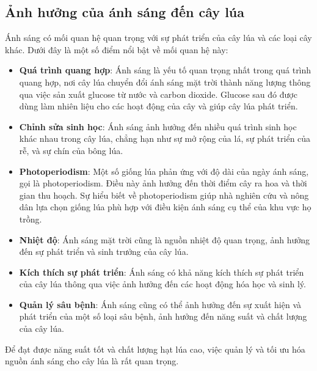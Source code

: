 \documentclass[12pt]{report}
\begin{document}
\subsection{Ảnh hưởng của ánh sáng đến cây lúa} %
\label{sub:ảnh_hưởng_của_ánh_sáng_đến_cây_lúa}
\begin{flushleft}
	Ánh sáng có mối quan hệ quan trọng với sự phát triển của cây lúa và các loại cây khác. Dưới đây là một số điểm nổi bật về mối quan hệ này:

	\begin{itemize}
		 \item \textbf{Quá trình quang hợp}: Ánh sáng là yếu tố quan trọng nhất trong quá trình quang hợp, nơi cây lúa chuyển đổi ánh sáng mặt trời thành năng lượng thông qua việc sản xuất glucose từ nước và carbon dioxide. Glucose sau đó được dùng làm nhiên liệu cho các hoạt động của cây và giúp cây lúa phát triển.

		 \item \textbf{Chỉnh sửa sinh học}: Ánh sáng ảnh hưởng đến nhiều quá trình sinh học khác nhau trong cây lúa, chẳng hạn như sự mở rộng của lá, sự phát triển của rễ, và sự chín của bông lúa.

		 \item \textbf{Photoperiodism}: Một số giống lúa phản ứng với độ dài của ngày ánh sáng, gọi là photoperiodism. Điều này ảnh hưởng đến thời điểm cây ra hoa và thời gian thu hoạch. Sự hiểu biết về photoperiodism giúp nhà nghiên cứu và nông dân lựa chọn giống lúa phù hợp với điều kiện ánh sáng cụ thể của khu vực họ trồng.

		 \item \textbf{Nhiệt độ}: Ánh sáng mặt trời cũng là nguồn nhiệt độ quan trọng, ảnh hưởng đến sự phát triển và sinh trưởng của cây lúa.

		 \item \textbf{Kích thích sự phát triển}: Ánh sáng có khả năng kích thích sự phát triển của cây lúa thông qua việc ảnh hưởng đến các hoạt động hóa học và sinh lý.

		 \item \textbf{Quản lý sâu bệnh}: Ánh sáng cũng có thể ảnh hưởng đến sự xuất hiện và phát triển của một số loại sâu bệnh, ảnh hưởng đến năng suất và chất lượng của cây lúa.
	\end{itemize}

	Để đạt được năng suất tốt và chất lượng hạt lúa cao, việc quản lý và tối ưu hóa nguồn ánh sáng cho cây lúa là rất quan trọng.
	\\[\baselineskip]


\end{flushleft}
\end{document}
